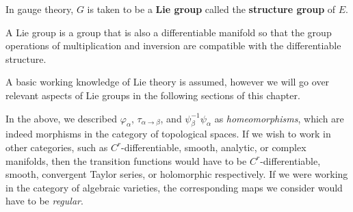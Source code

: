 	In gauge theory, $G$ is taken to be a \textbf{Lie group} called the \textbf{structure group} of $E$.
	\begin{defn}
		A Lie group is a group that is also a differentiable manifold so that the group operations of multiplication and inversion are compatible with the  differentiable structure. 
	\end{defn}
	A basic working knowledge of Lie theory is assumed, however we will go over relevant aspects of Lie groups in the following sections of this chapter.
	
	\begin{nb}
		In the above, we described $\varphi_\alpha$, $\tau_{\alpha \to \beta}$, and $\psi_\beta^{-1} \psi_\alpha$ as \emph{homeomorphisms}, which are indeed morphisms in the category of topological spaces. If we wish to work in other categories, such as $C^r$-differentiable, smooth, analytic, or complex manifolds, then the transition functions would have to be $C^r$-differentiable, smooth, convergent Taylor series, or holomorphic respectively. 
		If we were working in the category of algebraic varieties, the corresponding maps we consider would have to be \emph{regular}.
	\end{nb}	
		
